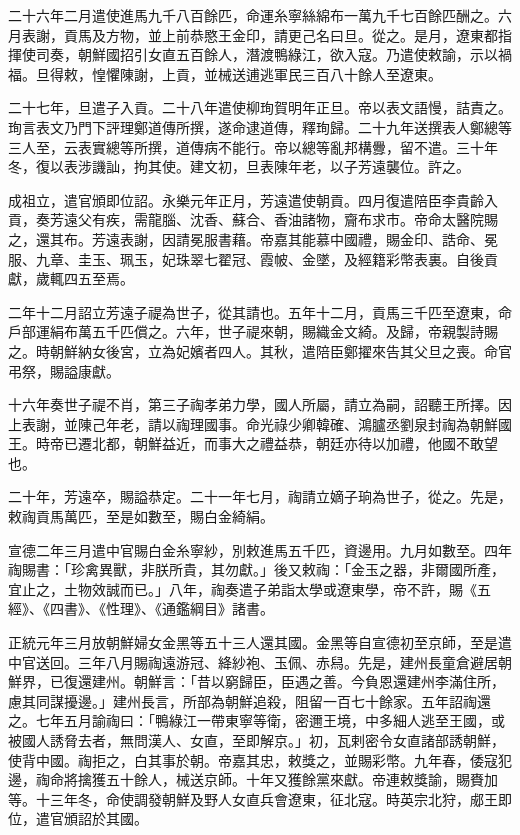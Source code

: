 \begin{pinyinscope}
二十六年二月遣使進馬九千八百餘匹，命運糸寧絲綿布一萬九千七百餘匹酬之。六月表謝，貢馬及方物，並上前恭愍王金印，請更己名曰旦。從之。是月，遼東都指揮使司奏，朝鮮國招引女直五百餘人，潛渡鴨綠江，欲入寇。乃遣使敕諭，示以禍福。旦得敕，惶懼陳謝，上貢，並械送逋逃軍民三百八十餘人至遼東。

二十七年，旦遣子入貢。二十八年遣使柳珣賀明年正旦。帝以表文語慢，詰責之。珣言表文乃門下評理鄭道傳所撰，遂命逮道傳，釋珣歸。二十九年送撰表人鄭總等三人至，云表實總等所撰，道傳病不能行。帝以總等亂邦構釁，留不遣。三十年冬，復以表涉譏訕，拘其使。建文初，旦表陳年老，以子芳遠襲位。許之。

成祖立，遣官頒即位詔。永樂元年正月，芳遠遣使朝貢。四月復遣陪臣李貴齡入貢，奏芳遠父有疾，需龍腦、沈香、蘇合、香油諸物，齎布求市。帝命太醫院賜之，還其布。芳遠表謝，因請冕服書藉。帝嘉其能慕中國禮，賜金印、誥命、冕服、九章、圭玉、珮玉，妃珠翠七翟冠、霞帔、金墜，及經籍彩幣表裏。自後貢獻，歲輒四五至焉。

二年十二月詔立芳遠子禔為世子，從其請也。五年十二月，貢馬三千匹至遼東，命戶部運絹布萬五千匹償之。六年，世子禔來朝，賜織金文綺。及歸，帝親製詩賜之。時朝鮮納女後宮，立為妃嬪者四人。其秋，遣陪臣鄭擢來告其父旦之喪。命官弔祭，賜謚康獻。

十六年奏世子禔不肖，第三子祹孝弟力學，國人所屬，請立為嗣，詔聽王所擇。因上表謝，並陳己年老，請以祹理國事。命光祿少卿韓確、鴻臚丞劉泉封祹為朝鮮國王。時帝已遷北都，朝鮮益近，而事大之禮益恭，朝廷亦待以加禮，他國不敢望也。

二十年，芳遠卒，賜謚恭定。二十一年七月，祹請立嫡子珦為世子，從之。先是，敕祹貢馬萬匹，至是如數至，賜白金綺絹。

宣德二年三月遣中官賜白金糸寧紗，別敕進馬五千匹，資邊用。九月如數至。四年祹賜書：「珍禽異獸，非朕所貴，其勿獻。」後又敕祹：「金玉之器，非爾國所產，宜止之，土物效誠而已。」八年，祹奏遣子弟詣太學或遼東學，帝不許，賜《五經》、《四書》、《性理》、《通鑑綱目》諸書。

正統元年三月放朝鮮婦女金黑等五十三人還其國。金黑等自宣德初至京師，至是遣中官送回。三年八月賜祹遠游冠、絳紗袍、玉佩、赤舄。先是，建州長童倉避居朝鮮界，已復還建州。朝鮮言：「昔以窮歸臣，臣遇之善。今負恩還建州李滿住所，慮其同謀擾邊。」建州長言，所部為朝鮮追殺，阻留一百七十餘家。五年詔祹還之。七年五月諭祹曰：「鴨綠江一帶東寧等衛，密邇王境，中多細人逃至王國，或被國人誘脅去者，無問漢人、女直，至即解京。」初，瓦剌密令女直諸部誘朝鮮，使背中國。祹拒之，白其事於朝。帝嘉其忠，敕獎之，並賜彩幣。九年春，倭寇犯邊，祹命將擒獲五十餘人，械送京師。十年又獲餘黨來獻。帝連敕獎諭，賜賚加等。十三年冬，命使調發朝鮮及野人女直兵會遼東，征北寇。時英宗北狩，郕王即位，遣官頒詔於其國。


\end{pinyinscope}
